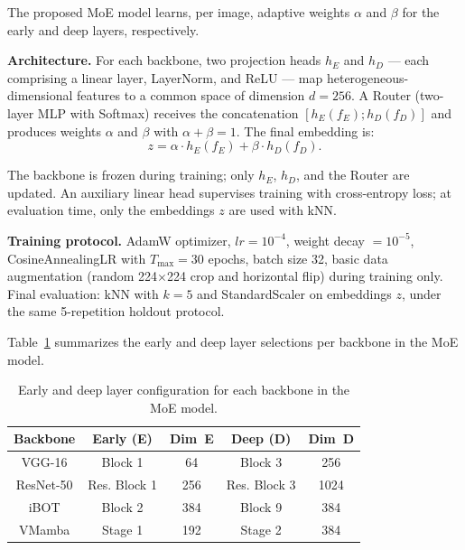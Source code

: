 \documentclass[letterpaper, 10 pt, conference]{ieeeconf}
\begin{document}
The proposed MoE model learns, per image, adaptive weights $\alpha$ and
$\beta$ for the early and deep layers, respectively.

\textbf{Architecture.} For each backbone, two projection heads $h_E$ and
$h_D$ — each comprising a linear layer, LayerNorm, and ReLU — map
heterogeneous-dimensional features to a common space of dimension $d=256$.
A Router (two-layer MLP with Softmax) receives the concatenation
$[h_E(f_E) ; h_D(f_D)]$ and produces weights $\alpha$ and $\beta$ with
$\alpha + \beta = 1$.
The final embedding is:
\begin{equation}
    z = \alpha \cdot h_E(f_E) + \beta \cdot h_D(f_D).
    \label{eq:moe}
\end{equation}

The backbone is frozen during training; only $h_E$, $h_D$, and the Router
are updated.
An auxiliary linear head supervises training with cross-entropy loss; at
evaluation time, only the embeddings $z$ are used with kNN.

\textbf{Training protocol.}
AdamW optimizer, $lr = 10^{-4}$, weight decay $= 10^{-5}$,
CosineAnnealingLR with $T_{\max} = 30$ epochs, batch size 32, basic data
augmentation (random 224$\times$224 crop and horizontal flip) during
training only.
Final evaluation: kNN with $k=5$ and StandardScaler on embeddings $z$,
under the same 5-repetition holdout protocol.

Table~\ref{tab_moe_config} summarizes the early and deep layer selections
per backbone in the MoE model.

\begin{table}[htbp]
\caption{Early and deep layer configuration for each backbone in the MoE
         model.}
\begin{center}
\begin{tabular}{c|c|c|c|c}
\hline
\textbf{Backbone} & \textbf{Early (E)} & \textbf{Dim~E}
                  & \textbf{Deep (D)} & \textbf{Dim~D} \\
\hline
VGG-16    & Block 1     & 64   & Block 3     & 256  \\
ResNet-50 & Res. Block 1 & 256  & Res. Block 3 & 1024 \\
iBOT      & Block 2     & 384  & Block 9     & 384  \\
VMamba    & Stage 1     & 192  & Stage 2     & 384  \\
\hline
\end{tabular}
\label{tab_moe_config}
\end{center}
\end{table}
\end{document}
